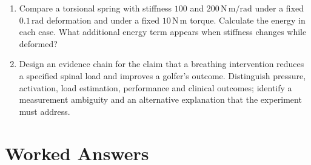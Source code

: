 \begin{enumerate}[leftmargin=*]
\item Compare a torsional spring with stiffness $100$ and $200\,\mathrm{N\,m/rad}$ under a fixed $0.1\,\mathrm{rad}$ deformation and under a fixed $10\,\mathrm{N\,m}$ torque. Calculate the energy in each case. What additional energy term appears when stiffness changes while deformed?
\item Design an evidence chain for the claim that a breathing intervention reduces a specified spinal load and improves a golfer's outcome. Distinguish pressure, activation, load estimation, performance and clinical outcomes; identify a measurement ambiguity and an alternative explanation that the experiment must address.
\end{enumerate}

\section{Worked Answers}
